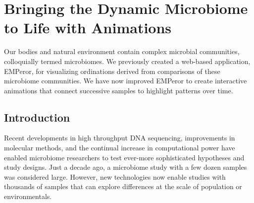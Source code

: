\glsresetall

\section{Bringing the Dynamic Microbiome to Life with Animations}\label{section_animations}

Our bodies and natural environment contain complex microbial communities, colloquially termed microbiomes. We previously created a web-based application, EMPeror, for visualizing ordinations derived from comparisons of these microbiome communities. We have now improved EMPeror to create interactive animations that connect successive samples to highlight patterns over time.

\subsection{Introduction}

Recent developments in high throughput DNA sequencing, improvements in molecular methods, and the continual increase in computational power have enabled microbiome researchers to test ever-more sophisticated hypotheses and study designs. Just a decade ago, a microbiome study with a few dozen samples was considered large. However, new technologies now enable studies with thousands of samples that can explore differences at the scale of population or environmentals.

